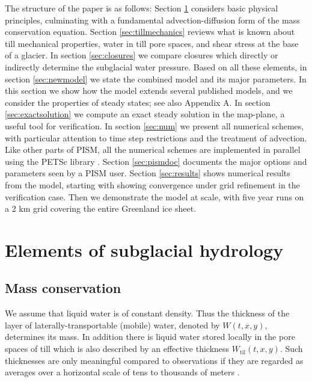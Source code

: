 \documentclass[gmd]{copernicus}   %
\newcommand{\text}{\textrm}
\newcommand{\Wtil}{W_{\text{til}}}
\begin{document}
The structure of the paper is as follows: Section \ref{sec:elements} considers basic physical principles, culminating with a fundamental advection-diffusion form of the mass conservation equation.  Section \ref{sec:tillmechanics} reviews what is known about till mechanical properties, water in till pore spaces, and shear stress at the base of a glacier.  In section \ref{sec:closures} we compare closures which directly or indirectly determine the subglacial water pressure.  Based on all these elements, in section \ref{sec:newmodel} we state the combined model and its major parameters.  In this section we show how the model extends several published models, and we consider the properties of steady states; see also Appendix A.  In section \ref{sec:exactsolution} we compute an exact steady solution in the map-plane, a useful tool for verification.  In section \ref{sec:num} we present all numerical schemes, with particular attention to time step restrictions and the treatment of advection.  Like other parts of PISM, all the numerical schemes are implemented in parallel using the PETSc library \citep{petsc-user-ref}.  Section \ref{sec:pismdoc} documents the major options and parameters seen by a PISM user.  Section \ref{sec:results} shows numerical results from the model, starting with showing convergence under grid refinement in the verification case.  Then we demonstrate the model at scale, with five year runs on a 2 km grid covering the entire Greenland ice sheet.


\section{Elements of subglacial hydrology} \label{sec:elements}

\subsection{Mass conservation}  We assume that liquid water is of constant density.  Thus the thickness of the layer of laterally-transportable (mobile) water, denoted by $W(t,x,y)$, determines its mass.  In addition there is liquid water stored locally in the pore spaces of till \citep{Tulaczyketal2000b} which is also described by an effective thickness $\Wtil(t,x,y)$.  Such thicknesses are only meaningful compared to observations if they are regarded as averages over a horizontal scale of tens to thousands of meters \citep{FlowersClarke2002_theory}.
\end{document}
